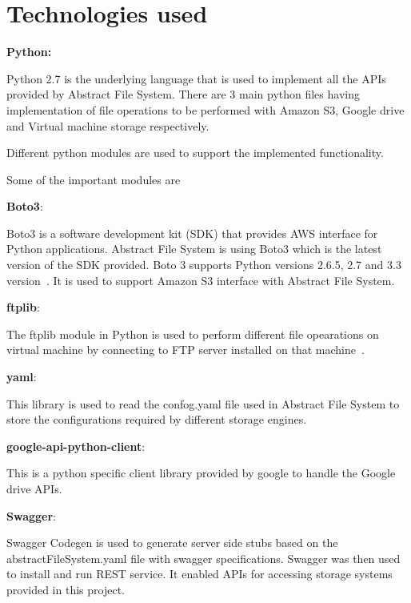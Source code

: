 \section{Technologies used}
\textbf{Python:}

Python 2.7 is the underlying language that is used to implement all the APIs 
provided by Abstract File System.  There are 3 main python files having 
implementation of file operations to be performed with Amazon S3, Google drive 
and Virtual machine storage respectively. 


Different python modules are used to support the implemented functionality.

Some of the important modules are 

\begin{description}
\item \textbf{Boto3}: 

Boto3 is a software development kit (SDK) that provides AWS interface for 
Python applications. Abstract File System is using Boto3 which is the latest 
version of the SDK provided. Boto 3 supports Python versions 2.6.5, 2.7 and 
3.3 version~\cite{hid-sp18-420-boto}. 
It is used to support Amazon S3 interface with Abstract File System.

\item \textbf{ftplib}:

The ftplib module in Python is used to perform different file opearations on 
virtual machine by connecting to FTP server installed on that 
machine~\cite{hid-sp18-420-FTP}.

\item \textbf{yaml}:

This library is used to read the confog.yaml file used in Abstract File System 
to store the configurations required by different storage engines.


\item \item \textbf{google-api-python-client}:

This is a python specific client library provided by google to handle the 
Google drive APIs.

\end{description}


\textbf{Swagger}:

Swagger Codegen is used to generate server side stubs based on the 
abstractFileSystem.yaml file with swagger specifications. 
Swagger was then used to install and run REST service. It enabled 
APIs for accessing storage systems provided in this project.



